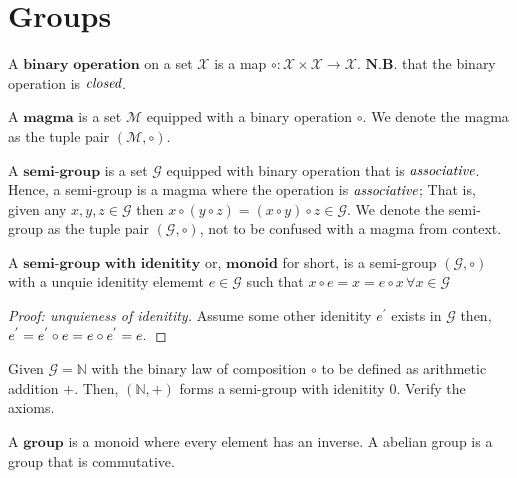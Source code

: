 \section{Groups} %
\label{sec:groups}

\begin{defn}
 A $\textbf{binary operation}$ on a set $\mathcal{X}$ is a map
 $\circ : \mathcal{X} \times \mathcal{X} \to \mathcal{X}$.
 $\textbf{N.B.}$ that the binary operation is $\emph{closed}$.
\end{defn}

\begin{defn}[Magma]
 A $\textbf{magma}$ is a set $\mathcal{M}$ equipped with a binary operation $\circ$.
 We denote the magma as the tuple pair $(\mathcal{M}, \circ)$.
\end{defn}


\begin{defn}
 A $\textbf{semi-group}$ is a set $\mathcal{G}$ equipped with binary operation that is $\emph{associative}$.
 Hence, a semi-group is a magma where the operation is $\emph{associative}$;
 That is, given any $x,y,z \in \mathcal{G}$ then $x \circ (y \circ z) = (x \circ y) \circ z \in \mathcal{G}$.
 We denote the semi-group as the tuple pair $(\mathcal{G}, \circ)$, not to be confused with a magma from context.
\end{defn}

\begin{defn}[Monoid]
 A $\textbf{semi-group with idenitity}$ or, $\textbf{monoid}$ for short, is a semi-group $(\mathcal{G}, \circ)$
 with a unquie idenitity elememt $e \in \mathcal{G}$ such that $x \circ e = x = e \circ x \, \forall x \in \mathcal{G}$
\end{defn}


\begin{proof}[Proof: unquieness of idenitity]
 Assume some other idenitity $e^{'}$ exists in $\mathcal{G}$ then, $e^{'} = e^{'} \circ e = e \circ e^{'} = e. \qedhere$
\end{proof}


\begin{exmp}
 Given $\mathcal{G} = \mathbb{N}$ with the binary law of composition $\circ$ to be defined as arithmetic addition $+$.
 Then, $(\mathbb{N}, +)$ forms a semi-group with idenitity $0$. Verify the axioms.
\end{exmp}


\begin{defn}[Group]
 A $\textbf{group}$ is a monoid where every element has an inverse. A abelian group is a group that is commutative.
\end{defn}


